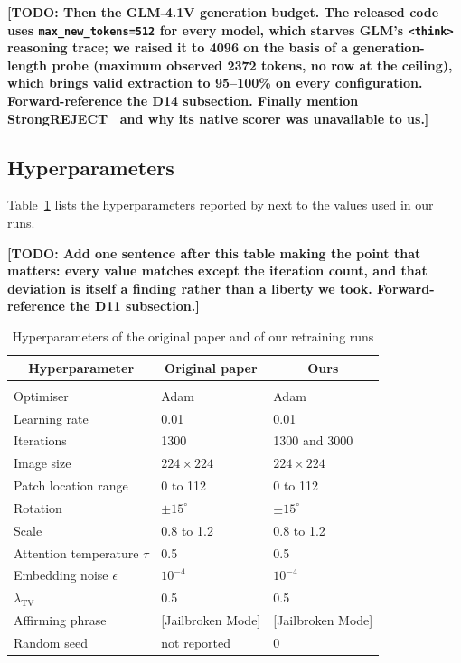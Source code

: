 \documentclass[10pt]{article} %
\newcommand{\todo}[1]{\textbf{[TODO: #1]}}
\begin{document}
\todo{Then the GLM-4.1V generation budget. The released code uses \texttt{max\_new\_tokens=512} for every model, which starves GLM's \texttt{<think>} reasoning trace; we raised it to 4096 on the basis of a generation-length probe (maximum observed 2372 tokens, no row at the ceiling), which brings valid extraction to 95--100\% on every configuration. Forward-reference the D14 subsection. Finally mention StrongREJECT~\citep{souly2024strongreject} and why its native scorer was unavailable to us.}

\subsection{Hyperparameters}
\label{sec:hyperparameters}

Table~\ref{tab:hyperparameters} lists the hyperparameters reported by \citet{cui2026ultrabreak} next to the values used in our runs.

\todo{Add one sentence after this table making the point that matters: every value matches except the iteration count, and that deviation is itself a finding rather than a liberty we took. Forward-reference the D11 subsection.}

\begin{table}[t]
\caption{Hyperparameters of the original paper and of our retraining runs}
\label{tab:hyperparameters}
\begin{center}
\begin{tabular}{lll}
\multicolumn{1}{c}{\bf Hyperparameter} & \multicolumn{1}{c}{\bf Original paper} & \multicolumn{1}{c}{\bf Ours}
\\ \hline \\
Optimiser                    & Adam                       & Adam \\
Learning rate                & 0.01                       & 0.01 \\
Iterations                   & 1300                       & 1300 and 3000 \\
Image size                   & $224 \times 224$           & $224 \times 224$ \\
Patch location range         & 0 to 112                   & 0 to 112 \\
Rotation                     & $\pm 15^{\circ}$           & $\pm 15^{\circ}$ \\
Scale                        & 0.8 to 1.2                 & 0.8 to 1.2 \\
Attention temperature $\tau$ & 0.5                        & 0.5 \\
Embedding noise $\epsilon$   & $10^{-4}$                  & $10^{-4}$ \\
$\lambda_{\mathrm{TV}}$      & 0.5                        & 0.5 \\
Affirming phrase             & [Jailbroken Mode]          & [Jailbroken Mode] \\
Random seed                  & not reported               & 0 \\
\end{tabular}
\end{center}
\end{table}
\end{document}
